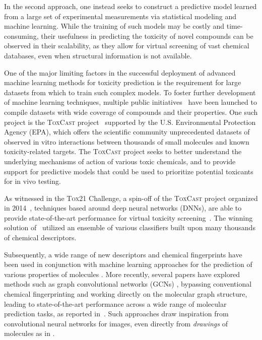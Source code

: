 \documentclass[11pt,a4paper]{article}
\begin{document}
In the second approach, one instead seeks to construct a predictive model
learned from a large set of experimental measurements via statistical modeling
and machine learning.  While the training of such models may be costly and
time-consuming, their usefulness in predicting the toxicity of novel compounds 
can be observed in their scalability, as they allow for virtual screening of vast
chemical databases, even when structural information is not available.


One of the major limiting factors in the successful deployment of advanced 
machine learning methods for toxicity prediction is the requirement for large
datasets from which to train such complex models. 
To foster further development of machine learning techniques, 
multiple public initiatives~\cite{Subramanian-A:2017aa} have been 
launched to compile datasets with wide coverage of compounds and their
properties.
One such project is the \textsc{ToxCast} project~\cite{Palmer:2007aa}
supported by the U.S. Environmental Protection Agency (EPA), which offers the
scientific community unprecedented datasets of observed in vitro interactions
between thousands of small molecules and known toxicity-related targets.  The
\textsc{ToxCast} project seeks to better understand the underlying mechanisms 
of action of various toxic chemicals, and to provide support for predictive 
models that could be used to prioritize potential toxicants for in vivo testing.   

As witnessed in the \textsc{Tox21} Challenge, a spin-off of the \textsc{ToxCast}
project organized in 2014~\cite{Huang:2017aa}, techniques based around deep neural
networks (DNNs), are able to provide state-of-the-art performance for virtual
toxicity screening~\cite{koutsoukas2017predictive,  huang2017tox21, ribay2016predictive,
drwal2017molecular, stefaniak2017prediction, huang2016tox21challenge}.
The winning solution of~\cite{mayr2017deeptox} utilized an
ensemble of various classifiers built upon many thousands of chemical 
descriptors.

Subsequently, a wide range of new descriptors and chemical fingerprints
have been used in conjunction with machine learning approaches for the 
prediction of various properties of molecules
\cite{Ramsundar:2015aa, Dahl:2014aa, unterthiner2014deep, wallach2015atomnet,lusci2013deep, ma2015deep}. 
More recently, several papers have explored methods such as graph convolutional networks 
(GCNs)
\cite{duvenaud2015convolutional, wu2017moleculenet, gomes2017atomic, kearnes2016molecular}, 
bypassing conventional chemical fingerprinting and working directly on the molecular graph
structure, leading to state-of-the-art performance across a wide range of 
molecular prediction tasks, as reported in~\cite{Wu:2017}. 
Such approaches draw inspiration from convolutional neural networks for images,
even directly from \emph{drawings} of molecules as in
\cite{goh2017chemception}.
\end{document}
